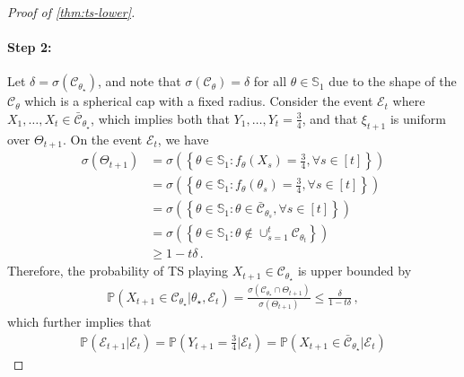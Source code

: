 \documentclass[letter, 12pt]{report}
\newcommand{\paren}[1]{\left( #1 \right)}
\newcommand{\cC}{\mathcal C}
\newcommand{\bS}{\mathbb S}
\newcommand{\1}{\mathbf{1}}
\newcommand{\mP}{\mathbb{P}}
\newcommand{\ts}{\textsc{TS}\xspace}
\theoremstyle{plain}
\theoremstyle{definition}
\theoremstyle{remark}
\begin{document}
\begin{proof}[Proof of \cref{thm:ts-lower}]
    \paragraph{Step 2:}
    Let $\delta = \sigma(\cC_{\theta_\star})$,
    and note that $\sigma(\cC_{\theta}) = \delta$ for all $\theta \in \bS_1$
    due to the shape of the $\cC_{\theta}$ which is a spherical cap with a
    fixed radius.
    Consider the event $\mathcal{E}_t$ where $X_1, \ldots, X_t \in \bar{\cC}_{\theta_\star}$,
    which implies both that $Y_1, \ldots, Y_t = \frac34$, and
    that $\xi_{t+1}$ is uniform over $\Theta_{t+1}$.
    On the event $\mathcal{E}_t$, we have
    \begin{align*}
        \sigma(\Theta_{t+1})
         & =
        \sigma\paren{
            \left\{
            \theta \in \bS_1:
            f_\theta(X_s) = \frac34
            ,
            \forall s \in [t]
            \right\}
        }
        \\
         & =
        \sigma\paren{
            \left\{
            \theta \in \bS_1:
            f_\theta(\theta_s) = \frac34
            ,
            \forall s \in [t]
            \right\}
        }
        \\
         & =
        \sigma\paren{
            \left\{
            \theta \in \bS_1:
            \theta \in \bar{\cC}_{\theta_s}
            ,
            \forall s \in [t]
            \right\}
        }
        \\
         & =
        \sigma\paren{
            \left\{
            \theta \in \bS_1:
            \theta \notin
            \cup_{s=1}^t
            \cC_{\theta_t}
            \right\}
        }
        \\
         & \geq 1 - t \delta\,.
    \end{align*}
    Therefore, the probability of \ts{} playing $X_{t+1} \in \cC_{\theta_\star}$
    is upper bounded by
    \begin{align*}
        \mP(X_{t+1} \in \cC_{\theta_\star} |\theta_\star, \mathcal{E}_t)
        =
        \frac{
            \sigma(\cC_{\theta_\star} \cap \Theta_{t+1})
        }{
            \sigma(\Theta_{t+1})
        }
        \leq
        \frac{
            \delta
        }{
            1 - t \delta
        }\,,
    \end{align*}
    which further implies that
    \begin{align*}
        \mP(\mathcal{E}_{t+1} | \mathcal{E}_t)
        =
        \mP\paren{Y_{t+1} = \frac34 | \mathcal{E}_t}
        =
        \mP(X_{t+1} \in \bar{\cC}_{\theta_\star} | \mathcal{E}_t)

\end{align*}
\end{proof}
\end{document}

